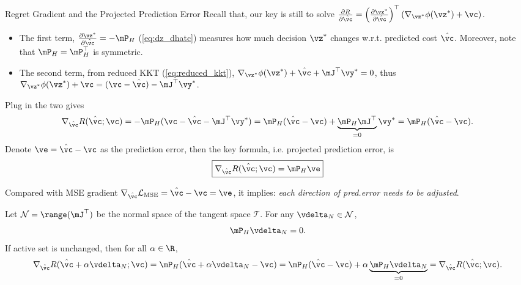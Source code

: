 \documentclass[10pt,aspectratio=169,xcolor=dvipsnames]{beamer}
\begin{document}
\begin{frame}[allowframebreaks]{Regret Gradient and the Projected Prediction Error}
    Recall that, our key is still to solve $\frac{\partial R}{\partial \hat{\vc}} = \left( \frac{\partial \vz^*}{\partial \hat{\vc}} \right)^\top \left( \nabla_{\vz^*} \phi(\vz^*) + \vc \right)$.
    \begin{itemize}
        \item The first term, $\frac{\partial \vz^*}{\partial \hat{\vc}} = -\mP_H$ (\eqref{eq:dz_dhatc}) measures how much decision $\vz^*$ changes w.r.t. predicted cost $\hat{\vc}$. Moreover, note that $\mP_H = \mP_H^\top$ is symmetric.
        \item The second term, from reduced KKT (\eqref{eq:reduced_kkt}), $\nabla_{\vz^*} \phi(\vz^*) + \hat{\vc} + \mJ^\top \vy^* = 0$, thus $\nabla_{\vz^*} \phi(\vz^*) + \vc = (\vc - \hat{\vc}) - \mJ^\top \vy^*$.
    \end{itemize}
    Plug in the two gives
    \begin{equation}
        \nabla_{\hat{\vc}} R(\hat{\vc}; \vc) = -\mP_H (\vc - \hat{\vc} - \mJ^\top \vy^*) = \mP_H (\hat{\vc} - \vc) + \underbrace{\mP_H \mJ^\top}_{=0} \vy^* = \mP_H (\hat{\vc} - \vc).
    \end{equation}
    Denote $\ve = \hat{\vc} - \vc$ as the prediction error, then the key formula, i.e. projected prediction error, is
    \begin{equation}\label{eq:regret_gradient}\boxed{
        \nabla_{\hat{\vc}} R(\hat{\vc}; \vc) = \mP_H \ve}
    \end{equation}

    Compared with MSE gradient $\nabla_{\hat{\vc}} \mathcal{L}_{\text{MSE}} = \hat{\vc} - \vc = \ve$, it implies: \emph{each direction of pred.error needs to be adjusted}.

    \break

    \begin{corollary}
        Let $\mathcal{N} = \range(\mJ^\top)$ be the normal space of the tangent space $\mathcal{T}$. For any $\vdelta_N \in \mathcal{N}$,
        \begin{equation}\label{eq:normal_invariance}
            \mP_H \vdelta_N = 0 .
        \end{equation}
         If active set is unchanged, then for all $\alpha \in \R$,
    \begin{equation}
        \nabla_{\hat{\vc}} R(\hat{\vc} + \alpha \vdelta_N; \vc) = \mP_H (\hat{\vc} + \alpha \vdelta_N - \vc) = \mP_H (\hat{\vc} - \vc) + \alpha \underbrace{\mP_H \vdelta_N}_{=0} = \nabla_{\hat{\vc}} R(\hat{\vc}; \vc).
    \end{equation}
    \end{corollary}


\end{frame}
\end{document}
